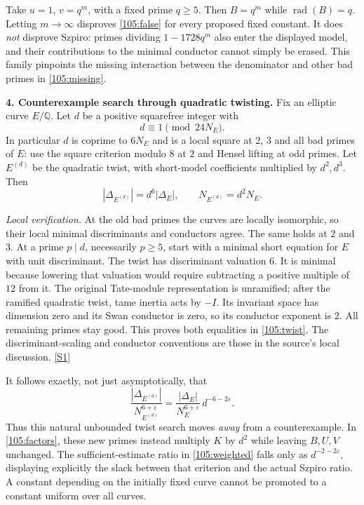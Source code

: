 \documentclass[11pt,a4paper]{article}
\newcommand{\Q}{\mathbb{Q}}
\newcommand{\sref}[2]{\hyperlink{source:#1:#2}{[S#2]}}
\numberwithin{equation}{section}
\begin{document}
Take $u=1$, $v=q^m$, with a fixed prime $q\geq5$. Then
$B=q^m$ while $\operatorname{rad}(B)=q$. Letting $m\to\infty$ disproves
\eqref{105:false} for every proposed fixed constant. It does \emph{not}
disprove Szpiro: primes dividing $1-1728q^m$ also enter the displayed model,
and their contributions to the minimal conductor cannot simply be erased.
This family pinpoints the missing interaction between the denominator and
other bad primes in \eqref{105:missing}.

\medskip
\textbf{4. Counterexample search through quadratic twisting.}
Fix an elliptic curve $E/\Q$. Let $d$ be a positive squarefree integer with
\[
 d\equiv1\pmod{24N_E}.
\]
In particular $d$ is coprime to $6N_E$ and is a local square at $2$, $3$ and
all bad primes of $E$: use the square criterion modulo $8$ at $2$ and Hensel
lifting at odd primes. Let $E^{(d)}$ be the quadratic twist, with short-model
coefficients multiplied by $d^2,d^3$. Then
\begin{equation}\label{105:twist}
 |\Delta_{E^{(d)}}|=d^6|\Delta_E|,
 \qquad N_{E^{(d)}}=d^2N_E.
\end{equation}

\emph{Local verification.} At the old bad primes the curves are locally
isomorphic, so their local minimal discriminants and conductors agree.
The same holds at $2$ and $3$. At a prime $p\mid d$, necessarily $p\geq5$,
start with a minimal short equation for $E$ with unit discriminant. The twist
has discriminant valuation $6$. It is minimal because lowering that valuation
would require subtracting a positive multiple of $12$ from it. The original
Tate-module representation is unramified; after the ramified quadratic twist,
tame inertia acts by $-I$. Its invariant space has dimension zero and its
Swan conductor is zero, so its conductor exponent is $2$. All remaining
primes stay good. This proves both equalities in \eqref{105:twist}.
The discriminant-scaling and conductor conventions are those in the
source's local discussion. \sref{105}{1}

It follows exactly, not just asymptotically, that
\begin{equation}\label{105:twist-ratio}
 \frac{|\Delta_{E^{(d)}}|}{N_{E^{(d)}}^{6+\varepsilon}}
 =\frac{|\Delta_E|}{N_E^{6+\varepsilon}}\,d^{-6-2\varepsilon}.
\end{equation}
Thus this natural unbounded twist search moves \emph{away} from a
counterexample. In \eqref{105:factors}, these new primes instead multiply
$K$ by $d^2$ while leaving $B,U,V$ unchanged. The sufficient-estimate ratio
in \eqref{105:weighted} falls only as $d^{-2-2\varepsilon}$, displaying
explicitly the slack between that criterion and the actual Szpiro ratio.
A constant depending on the initially fixed curve cannot be promoted to a
constant uniform over all curves.
\end{document}
